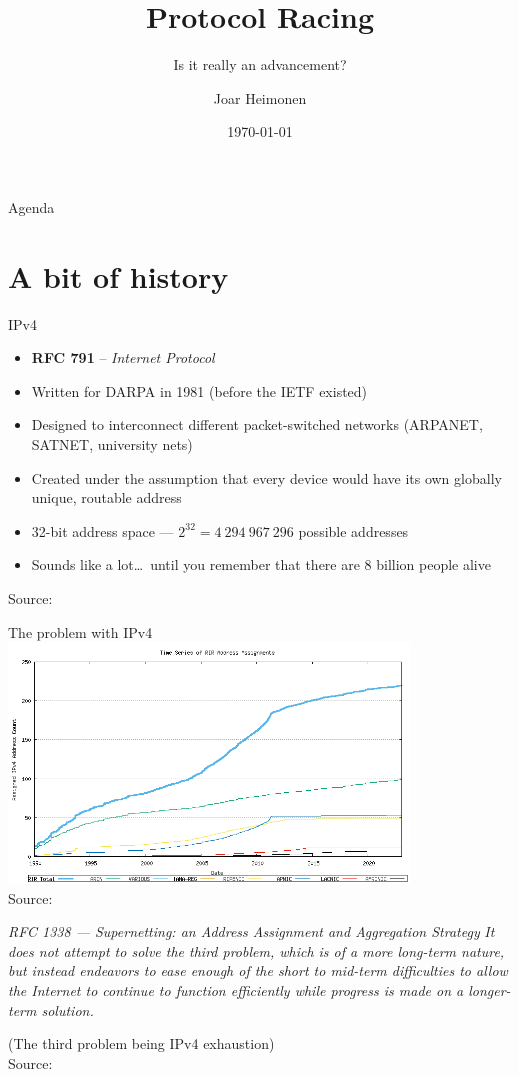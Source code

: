 \documentclass[aspectratio=169]{beamer}
\title[Protocol Racing]{Protocol Racing}
\subtitle{Is it really an advancement?}
\author[Joar Heimonen]{Joar Heimonen}
\date{\today}
\begin{document}
\uiofrontpage[dept={}, image={image.png}, inverted]

\begin{frame}{Agenda}
  \tableofcontents
\end{frame}

\section{A bit of history}
\begin{frame}{IPv4}
  \begin{itemize}
    \item \textbf{RFC 791} – \emph{Internet Protocol}
    \item Written for DARPA in 1981 (before the IETF existed)
    \item Designed to interconnect different packet-switched networks (ARPANET, SATNET, university nets)
    \item Created under the assumption that every device would have its own globally unique, routable address
    \item 32-bit address space — \(2^{32} = 4\ 294\ 967\ 296\) possible addresses
    \item Sounds like a lot\ldots\ until you remember that there are 8 billion people alive
  \end{itemize}
  \centering
  {\tiny Source: }
\end{frame}

\begin{frame}{The problem with IPv4}
  \centering
  \includegraphics[width=0.8\textwidth]{fig09.png}
  \\
  {\tiny Source: }
\end{frame}

\begin{frame}
\small
\begin{block}{\textit{RFC 1338 — Supernetting: an Address Assignment and Aggregation Strategy}}
\vspace{0.5em}
\textit{It does not attempt to solve the third problem,
which is of a more long-term nature, but instead endeavors to ease
enough of the short to mid-term difficulties to allow the Internet to
continue to function efficiently while progress is made on a longer-
term solution.}
\end{block}
(The third problem being IPv4 exhaustion)
\centering
\\
{\tiny Source: }
\end{frame}
\end{document}
